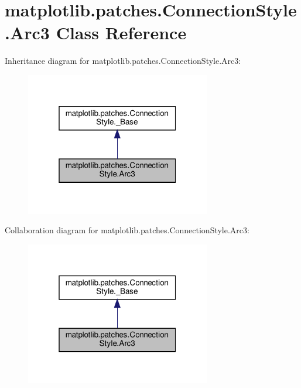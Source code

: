 \hypertarget{classmatplotlib_1_1patches_1_1ConnectionStyle_1_1Arc3}{}\section{matplotlib.\+patches.\+Connection\+Style.\+Arc3 Class Reference}
\label{classmatplotlib_1_1patches_1_1ConnectionStyle_1_1Arc3}


Inheritance diagram for matplotlib.\+patches.\+Connection\+Style.\+Arc3\+:
\nopagebreak
\begin{figure}[H]
\begin{center}
\leavevmode
\includegraphics[width=229pt]{classmatplotlib_1_1patches_1_1ConnectionStyle_1_1Arc3__inherit__graph}
\end{center}
\end{figure}


Collaboration diagram for matplotlib.\+patches.\+Connection\+Style.\+Arc3\+:
\nopagebreak
\begin{figure}[H]
\begin{center}
\leavevmode
\includegraphics[width=229pt]{classmatplotlib_1_1patches_1_1ConnectionStyle_1_1Arc3__coll__graph}
\end{center}
\end{figure}
